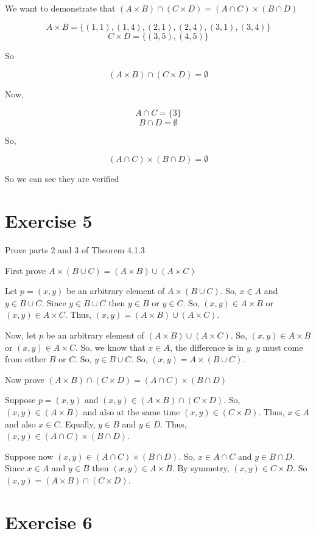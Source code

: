 \documentclass[11pt]{article}
\begin{document}
We want to demonstrate that $(A \times B) \cap (C \times D) = (A \cap C) \times (B \cap D)$

$$A \times B = \{ (1,1), (1,4), (2,1), (2,4), (3,1), (3,4) \}$$
$$C \times D = \{ (3,5), (4,5) \}$$

So 

$$(A \times B) \cap (C \times D) = \emptyset$$

Now,

$$A \cap C = \{3\}$$
$$B \cap D = \emptyset$$

So, 

$$(A \cap C) \times (B \cap D) = \emptyset$$

So we can see they are verified

\section*{Exercise 5}

Prove parts 2 and 3 of Theorem 4.1.3 

First prove $A \times (B \cup C) = (A \times B) \cup (A \times C)$

Let $p = (x,y)$ be an arbitrary element of $A \times (B \cup C)$. So, $x \in A$ 
and $y \in B \cup C$. Since $y \in B \cup C$ then $y \in B$ or $y \in C$. 
So, $(x,y) \in A \times B$ or $(x,y) \in A \times C$. Thus, 
$(x,y)=(A \times B) \cup (A \times C)$.

Now, let $p$ be an arbitrary element of $(A \times B) \cup (A \times C)$. So, 
$(x, y) \in A \times B$ or $(x, y) \in A \times C$. So, we know that $x \in A$,
the difference is in $y$. $y$ must come from either $B$ or $C$. So, 
$y \in B \cup C$. So, $(x,y) = A \times (B \cup C)$.

Now prove $(A \times B) \cap (C \times D) = (A \cap C) \times (B \cap D)$

Suppose $p = (x,y)$ and $(x,y) \in (A \times B) \cap (C \times D)$. 
So, $(x, y) \in (A \times B)$ and also at the same time $(x,y) \in (C \times D)$.
Thus, $x \in A$ and also $x \in C$. Equally, $y \in B$ and $y \in D$. Thus, 
$(x,y) \in (A \cap C) \times (B \cap D)$.

Suppose now $(x,y) \in (A \cap C) \times (B \cap D)$. So, $x \in A \cap C$ and 
$y \in B \cap D$. Since $x \in A$ and $y \in B$ then $(x,y) \in A \times B$. 
By symmetry, $(x,y) \in C \times D$. So $(x,y) = (A \times B) \cap (C \times D)$.

\section*{Exercise 6}
\end{document}
